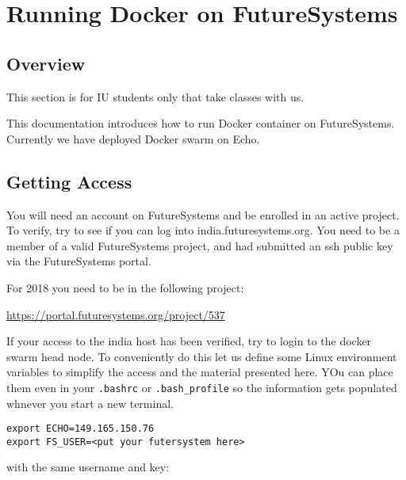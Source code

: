 \chapter{Running Docker on FutureSystems}\label{S:docker-fg}

\FILENAME

\section{Overview}\label{overview}

\begin{IU}

This section is for IU students only that take classes with us.
\end{IU}

This documentation introduces how to run Docker container on
FutureSystems. Currently we have deployed Docker swarm on Echo.

\section{Getting Access}\label{getting-access}

You will need an account on FutureSystems and be enrolled in an active
project.  To verify, try to see if you can log into
india.futuresystems.org. You need to be a member of a valid
FutureSystems project, and had submitted an ssh public key via the
FutureSystems portal.

\begin{IU}
For 2018 you need to be in the following project:

\url{https://portal.futuresystems.org/project/537}

\end{IU}

If your access to the india host has been verified, try to login to
the docker swarm head node. To conveniently do this let us define some
Linux environment variables to simplify the access and the material
presented here. YOu can place them even in your \verb|.bashrc| or
\verb|.bash_profile| so the information gets populated whnever you start a
new terminal.

\begin{lstlisting}
export ECHO=149.165.150.76
export FS_USER=<put your futersystem here>
\end{lstlisting}


with the same username and key:

